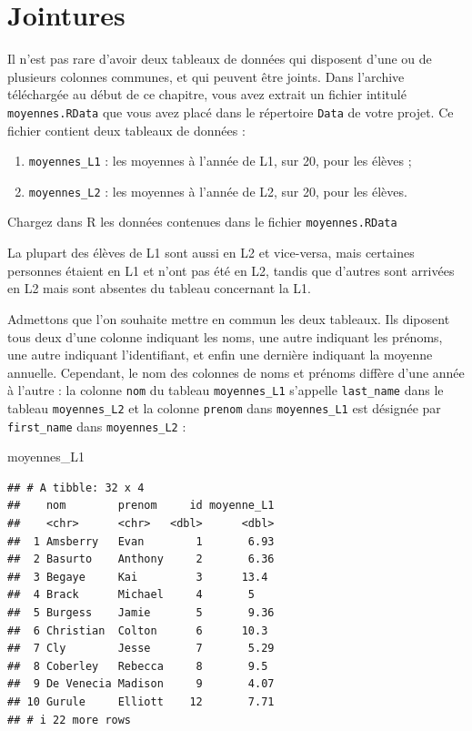 \documentclass[
  11pt,
]{book}
\newenvironment{Shaded}{\begin{snugshade}}{\end{snugshade}}
\newcommand{\NormalTok}[1]{#1}
\providecommand{\tightlist}{%
  \setlength{\itemsep}{0pt}\setlength{\parskip}{0pt}}
\numberwithin{equation}{section}
\numberwithin{countremarque}{section}
\newenvironment{greenbox}{
  \begin{tcolorbox}[breakable, colback=vert,coltext=black,
                  colframe=grisfonce]}
 {\end{tcolorbox}}
\begin{document}
\hypertarget{jointures}{%
\section{Jointures}\label{jointures}}

Il n'est pas rare d'avoir deux tableaux de données qui disposent d'une ou de plusieurs colonnes communes, et qui peuvent être joints. Dans l'archive téléchargée au début de ce chapitre, vous avez extrait un fichier intitulé \texttt{moyennes.RData} que vous avez placé dans le répertoire \texttt{Data} de votre projet. Ce fichier contient deux tableaux de données :

\begin{enumerate}
\def\labelenumi{\arabic{enumi}.}
\tightlist
\item
  \texttt{moyennes\_L1} : les moyennes à l'année de L1, sur 20, pour les élèves ;
\item
  \texttt{moyennes\_L2} : les moyennes à l'année de L2, sur 20, pour les élèves.
\end{enumerate}

\begin{greenbox}
Chargez dans R les données contenues dans le fichier \texttt{moyennes.RData}

\end{greenbox}

La plupart des élèves de L1 sont aussi en L2 et vice-versa, mais certaines personnes étaient en L1 et n'ont pas été en L2, tandis que d'autres sont arrivées en L2 mais sont absentes du tableau concernant la L1.

Admettons que l'on souhaite mettre en commun les deux tableaux. Ils diposent tous deux d'une colonne indiquant les noms, une autre indiquant les prénoms, une autre indiquant l'identifiant, et enfin une dernière indiquant la moyenne annuelle. Cependant, le nom des colonnes de noms et prénoms diffère d'une année à l'autre : la colonne \texttt{nom} du tableau \texttt{moyennes\_L1} s'appelle \texttt{last\_name} dans le tableau \texttt{moyennes\_L2} et la colonne \texttt{prenom} dans \texttt{moyennes\_L1} est désignée par \texttt{first\_name} dans \texttt{moyennes\_L2} :

\begin{Shaded}
\begin{Highlighting}[]
\NormalTok{moyennes\_L1}
\end{Highlighting}
\end{Shaded}

\begin{lstlisting}
## # A tibble: 32 x 4
##    nom        prenom     id moyenne_L1
##    <chr>      <chr>   <dbl>      <dbl>
##  1 Amsberry   Evan        1       6.93
##  2 Basurto    Anthony     2       6.36
##  3 Begaye     Kai         3      13.4 
##  4 Brack      Michael     4       5   
##  5 Burgess    Jamie       5       9.36
##  6 Christian  Colton      6      10.3 
##  7 Cly        Jesse       7       5.29
##  8 Coberley   Rebecca     8       9.5 
##  9 De Venecia Madison     9       4.07
## 10 Gurule     Elliott    12       7.71
## # i 22 more rows
\end{lstlisting}
\end{document}
